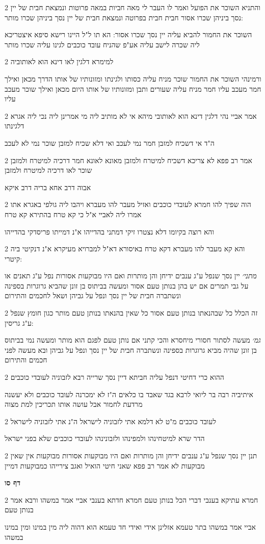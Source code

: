 \documentclass[12pt, openany]{book}
\newcommand{\sethebfont}{
\fontsize{10.5pt}{21.0pt} \selectfont
}
\newcommand{\twocol}[1]{
	{\sethebfont \begin{multicols}{2}
			#1
	\end{multicols}}	
}
\newcommand{\sectname}{}
\newcommand{\newsection}[1]{
	\addcontentsline{toc}{section}{#1}
	\renewcommand{\sectname}{#1}	
	\vspace{-\baselineskip}
	\begin{center}
		\textbf{%
\fontsize{16pt}{16pt}\selectfont
			#1}
	\end{center}
	\vspace{-\baselineskip}
	\nopagebreak
}
\begin{document}
\twocol{והתניא השוכר את הפועל ואמר לו העבר לי מאה חביות במאה פרוטות ונמצאת חבית של יין נסך ביניהן שכרו אסור חבית חבית בפרוטה ונמצאת חבית של יין נסך ביניהן שכרו מותר:
\par השוכר את החמור להביא עליה יין נסך שכרו אסור: הא תו ל"ל היינו רישא סיפא איצטריכא ליה שכרה לישב עליה אע"פ שהניח עובד כוכבים לגינו עליה שכרו מותר}
\twocol{למימרא דלגין לאו דינא הוא לאותוביה
\par ורמינהי השוכר את החמור שוכר מניח עליה כסותו ולגינתו ומזונותיו של אותו הדרך מכאן ואילך חמר מעכב עליו חמר מניח עליה שעורים ותבן ומזונותיו של אותו היום מכאן ואילך שוכר מעכב עליו}
\twocol{אמר אביי נהי דלגין דינא הוא לאותובי מיהא אי לא מותיב ליה מי אמרינן ליה נכי ליה אגרא דלגינתו
\par ה"ד אי דשכיח למזבן חמר נמי לעכב ואי דלא שכיח למזבן שוכר נמי לא לעכב}
\twocol{אמר רב פפא לא צריכא דשכיח למיטרח ולמזבן מאונא לאונא חמר דרכיה למיטרח ולמזבן שוכר לאו דרכיה למיטרח ולמזבן
\par אבוה דרב אחא בריה דרב איקא}
\twocol{הוה שפיך להו חמרא לעובדי כוכבים ואזיל מעבר להו מעברא ויהבו ליה גולפי באגרא אתו אמרו ליה לאביי א"ל כי קא טרח בהתירא קא טרח
\par והא רוצה בקיומו דלא נצטרו זיקי דמתני בהדייהו א"נ דמייתו פריסדקי בהדייהו}
\twocol{והא קא מעבר להו מעברא דקא טרח באיסורא דא"ל למברויא מעיקרא א"נ דנקיטי ביה קיטרי:
\par {\large\emph{מתני׳}} יין נסך שנפל ע"ג ענבים ידיחן והן מותרות ואם היו מבוקעות אסורות נפל ע"ג תאנים או על גבי תמרים אם יש בהן בנותן טעם אסור ומעשה בביתוס בן זונן שהביא גרוגרות בספינה ונשתברה חבית של יין נסך ונפל על גביהן ושאל לחכמים והתירום}
\twocol{זה הכלל כל שבהנאתו בנותן טעם אסור כל שאין בהנאתו בנותן טעם מותר כגון חומץ שנפל ע"ג גריסין:
\par {\large\emph{גמ׳}} מעשה לסתור חסורי מיחסרא והכי קתני אם נותן טעם לפגם הוא מותר ומעשה נמי בביתוס בן זונן שהיה מביא גרוגרות בספינה ונשתברה חבית של יין נסך ונפל על גביהן ובא מעשה לפני חכמים והתירום}
\twocol{ההוא כרי דחיטי דנפל עליה חביתא דיין נסך שרייה רבא לזבוניה לעובדי כוכבים
\par איתיביה רבה בר ליואי לרבא בגד שאבד בו כלאים ה"ז לא ימכרנה לעובד כוכבים ולא יעשנה מרדעת לחמור אבל עושה אותו תכריכין למת מצוה}
\twocol{לעובד כוכבים מ"ט לא דלמא אתי לזבוניה לישראל ה"נ אתי לזבוניה לישראל
\par הדר שרא למיטחינהו ולמפינהו ולזבונינהו לעובדי כוכבים שלא בפני ישראל}
\twocol{תנן יין נסך שנפל ע"ג ענבים ידיחן והן מותרות ואם היו מבוקעות אסורות מבוקעות אין שאין מבוקעות לא אמר רב פפא שאני חיטי הואיל ואגב צירייהו כמבוקעות דמיין}
\newsection{דף סו}
\twocol{חמרא עתיקא בענבי דברי הכל בנותן טעם חמרא חדתא בענבי אביי אמר במשהו ורבא אמר בנותן טעם
\par אביי אמר במשהו בתר טעמא אזלינן אידי ואידי חד טעמא הוא דהוה ליה מין במינו ומין במינו במשהו}
\end{document}
